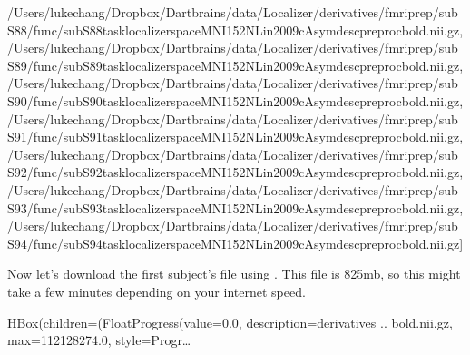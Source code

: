 \documentclass[letterpaper,10pt,english]{sphinxmanual}
\begin{document}
\begin{sphinxVerbatim}[commandchars=\\\{\}]
 \PYGZsq{}/Users/lukechang/Dropbox/Dartbrains/data/Localizer/derivatives/fmriprep/sub\PYGZhy{}S88/func/sub\PYGZhy{}S88\PYGZus{}task\PYGZhy{}localizer\PYGZus{}space\PYGZhy{}MNI152NLin2009cAsym\PYGZus{}desc\PYGZhy{}preproc\PYGZus{}bold.nii.gz\PYGZsq{},
 \PYGZsq{}/Users/lukechang/Dropbox/Dartbrains/data/Localizer/derivatives/fmriprep/sub\PYGZhy{}S89/func/sub\PYGZhy{}S89\PYGZus{}task\PYGZhy{}localizer\PYGZus{}space\PYGZhy{}MNI152NLin2009cAsym\PYGZus{}desc\PYGZhy{}preproc\PYGZus{}bold.nii.gz\PYGZsq{},
 \PYGZsq{}/Users/lukechang/Dropbox/Dartbrains/data/Localizer/derivatives/fmriprep/sub\PYGZhy{}S90/func/sub\PYGZhy{}S90\PYGZus{}task\PYGZhy{}localizer\PYGZus{}space\PYGZhy{}MNI152NLin2009cAsym\PYGZus{}desc\PYGZhy{}preproc\PYGZus{}bold.nii.gz\PYGZsq{},
 \PYGZsq{}/Users/lukechang/Dropbox/Dartbrains/data/Localizer/derivatives/fmriprep/sub\PYGZhy{}S91/func/sub\PYGZhy{}S91\PYGZus{}task\PYGZhy{}localizer\PYGZus{}space\PYGZhy{}MNI152NLin2009cAsym\PYGZus{}desc\PYGZhy{}preproc\PYGZus{}bold.nii.gz\PYGZsq{},
 \PYGZsq{}/Users/lukechang/Dropbox/Dartbrains/data/Localizer/derivatives/fmriprep/sub\PYGZhy{}S92/func/sub\PYGZhy{}S92\PYGZus{}task\PYGZhy{}localizer\PYGZus{}space\PYGZhy{}MNI152NLin2009cAsym\PYGZus{}desc\PYGZhy{}preproc\PYGZus{}bold.nii.gz\PYGZsq{},
 \PYGZsq{}/Users/lukechang/Dropbox/Dartbrains/data/Localizer/derivatives/fmriprep/sub\PYGZhy{}S93/func/sub\PYGZhy{}S93\PYGZus{}task\PYGZhy{}localizer\PYGZus{}space\PYGZhy{}MNI152NLin2009cAsym\PYGZus{}desc\PYGZhy{}preproc\PYGZus{}bold.nii.gz\PYGZsq{},
 \PYGZsq{}/Users/lukechang/Dropbox/Dartbrains/data/Localizer/derivatives/fmriprep/sub\PYGZhy{}S94/func/sub\PYGZhy{}S94\PYGZus{}task\PYGZhy{}localizer\PYGZus{}space\PYGZhy{}MNI152NLin2009cAsym\PYGZus{}desc\PYGZhy{}preproc\PYGZus{}bold.nii.gz\PYGZsq{}]
\end{sphinxVerbatim}

Now let’s download the first subject’s file using . This file is 825mb, so this might take a few minutes depending on your internet speed.

\begin{sphinxVerbatim}[commandchars=\\\{\}]
  \PYG{p}{[}\PYG{p}{]}
\end{sphinxVerbatim}

\begin{sphinxVerbatim}[commandchars=\\\{\}]
HBox(children=(FloatProgress(value=0.0, description=\PYGZsq{}derivatives .. bold.nii.gz\PYGZsq{}, max=112128274.0, style=Progr…
\end{sphinxVerbatim}
\end{document}

